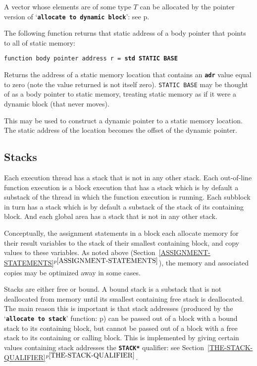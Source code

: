 \documentclass[12pt]{article}
\makeatletter
\newcommand{\TT}[1]{{\tt \bfseries #1}}
\newcommand{\ttstdkey}[1]{\TT{std #1}\index{#1@{\tt std #1}}}
\newcommand{\itemref}[1]{\ref{#1}$^{p\pageref{#1}}$}
\newcommand{\pagref}[1]{p\pageref{#1}}
\newenvironment{indpar}[1][0.3in]%
	{\begin{list}{}%
		     {\setlength{\itemsep}{0in}%
		      \setlength{\topsep}{0in}%
		      \setlength{\parsep}{1ex}%
		      \setlength{\labelwidth}{#1}%
		      \setlength{\leftmargin}{#1}%
		      \addtolength{\leftmargin}{\labelsep}}%
	 \item}%
	{\end{list}}
\makeatother
\begin{document}
A vector whose elements are of some type $T$ can be allocated by
the pointer version of `\TT{allocate to dynamic block}': see
\pagref{POINTER-ALLOCATE-TO-DYNAMIC-BLOCK}.

The following function returns that static address of a body
pointer that points to all of static memory:

\begin{indpar}

{\tt function body pointer address r =
    \ttstdkey{STATIC BASE}}\label{STATIC BASE}\label{STATIC-BASE}

\begin{indpar}
Returns the address of a static memory location that contains an
\TT{adr} value equal to zero (note the value returned is not itself zero).
{\tt STATIC BASE} may be thought of as a body pointer to static memory,
treating static memory as if it were a dynamic block (that never moves).

This may be used to construct a dynamic pointer to a static
memory location.  The static address of the location becomes the
offset of the dynamic pointer.
\end{indpar}

\end{indpar}

\subsection{Stacks}
\label{STACKS}

Each execution thread has a stack that is not in any other
stack.  Each out-of-line function
execution is a block execution that has a stack which is
by default a substack of the thread in which the function
execution is running.  Each subblock in turn has a stack
which is by default a substack of the stack of its containing block.
And each global area has a stack that is not in any other stack.

Conceptually, the assignment statements in a block each allocate memory for
their result variables to the stack of their smallest containing
block, and copy values to these
variables.  As noted above (Section~\itemref{ASSIGNMENT-STATEMENTS}),
the memory and associated copies may be
optimized away in some cases.

Stacks are either free or bound.\label{FREE-STACK}
A bound stack is a substack that is
not deallocated from memory until its smallest containing free stack is
deallocated.  The main reason this is important is that stack addresses
(produced by the `\TT{allocate to stack}' function:
\pagref{ALLOCATE-TO-STACK})
can be passed out of a block with a bound stack to its containing block,
but cannot be passed out of a block with a free stack to its containing
or calling block.  This is implemented by giving certain
values containing stack addresses the \TT{*STACK*} qualifier: see
Section~\itemref{THE-STACK-QUALIFIER}.
\end{document}
